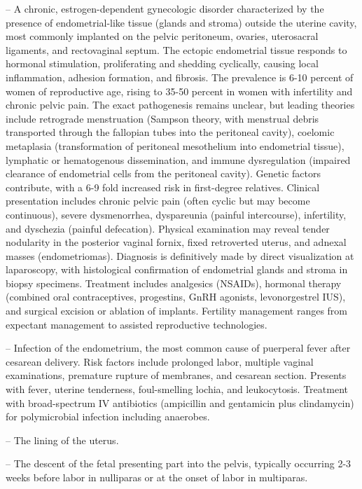 -- A chronic, estrogen-dependent gynecologic disorder characterized by the presence of endometrial-like tissue (glands and stroma) outside the uterine cavity, most commonly implanted on the pelvic peritoneum, ovaries, uterosacral ligaments, and rectovaginal septum. The ectopic endometrial tissue responds to hormonal stimulation, proliferating and shedding cyclically, causing local inflammation, adhesion formation, and fibrosis. The prevalence is 6-10 percent of women of reproductive age, rising to 35-50 percent in women with infertility and chronic pelvic pain. The exact pathogenesis remains unclear, but leading theories include retrograde menstruation (Sampson theory, with menstrual debris transported through the fallopian tubes into the peritoneal cavity), coelomic metaplasia (transformation of peritoneal mesothelium into endometrial tissue), lymphatic or hematogenous dissemination, and immune dysregulation (impaired clearance of endometrial cells from the peritoneal cavity). Genetic factors contribute, with a 6-9 fold increased risk in first-degree relatives. Clinical presentation includes chronic pelvic pain (often cyclic but may become continuous), severe dysmenorrhea, dyspareunia (painful intercourse), infertility, and dyschezia (painful defecation). Physical examination may reveal tender nodularity in the posterior vaginal fornix, fixed retroverted uterus, and adnexal masses (endometriomas). Diagnosis is definitively made by direct visualization at laparoscopy, with histological confirmation of endometrial glands and stroma in biopsy specimens. Treatment includes analgesics (NSAIDs), hormonal therapy (combined oral contraceptives, progestins, GnRH agonists, levonorgestrel IUS), and surgical excision or ablation of implants. Fertility management ranges from expectant management to assisted reproductive technologies.

-- Infection of the endometrium, the most common cause of puerperal fever after cesarean delivery. Risk factors include prolonged labor, multiple vaginal examinations, premature rupture of membranes, and cesarean section. Presents with fever, uterine tenderness, foul-smelling lochia, and leukocytosis. Treatment with broad-spectrum IV antibiotics (ampicillin and gentamicin plus clindamycin) for polymicrobial infection including anaerobes.

-- The lining of the uterus.

-- The descent of the fetal presenting part into the pelvis, typically occurring 2-3 weeks before labor in nulliparas or at the onset of labor in multiparas.

